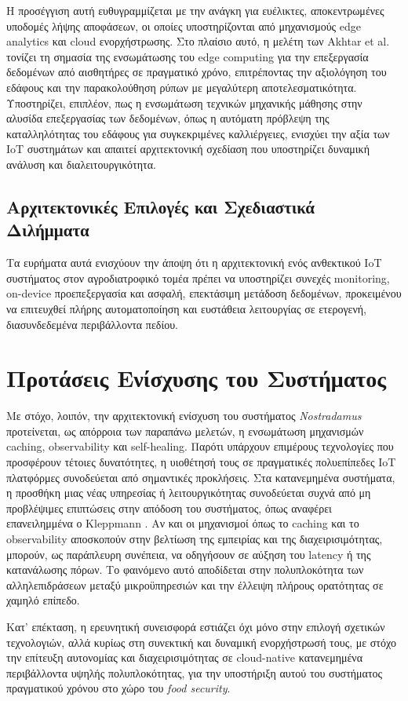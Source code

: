 Η προσέγγιση αυτή ευθυγραμμίζεται με την ανάγκη για ευέλικτες, αποκεντρωμένες υποδομές λήψης αποφάσεων, οι οποίες υποστηρίζονται από μηχανισμούς edge analytics και cloud ενορχήστρωσης. Στο πλαίσιο αυτό, η μελέτη των Akhtar et al. \cite{edgeagriculture} τονίζει τη σημασία της ενσωμάτωσης του edge computing για την επεξεργασία δεδομένων από αισθητήρες σε πραγματικό χρόνο, επιτρέποντας την αξιολόγηση του εδάφους και την παρακολούθηση ρύπων με μεγαλύτερη αποτελεσματικότητα. Υποστηρίζει, επιπλέον, πως η ενσωμάτωση τεχνικών μηχανικής μάθησης στην αλυσίδα επεξεργασίας των δεδομένων, όπως η αυτόματη πρόβλεψη της καταλληλότητας του εδάφους για συγκεκριμένες καλλιέργειες, ενισχύει την αξία των IoT συστημάτων και απαιτεί αρχιτεκτονική σχεδίαση που υποστηρίζει δυναμική ανάλυση και διαλειτουργικότητα.

\subsection{Αρχιτεκτονικές Επιλογές και Σχεδιαστικά Διλήμματα}

Τα ευρήματα αυτά ενισχύουν την άποψη ότι η αρχιτεκτονική ενός ανθεκτικού IoT συστήματος στον αγροδιατροφικό τομέα πρέπει να υποστηρίζει συνεχές monitoring, on-device προεπεξεργασία και ασφαλή, επεκτάσιμη μετάδοση δεδομένων, προκειμένου να επιτευχθεί πλήρης αυτοματοποίηση και ευστάθεια λειτουργίας σε ετερογενή, διασυνδεδεμένα περιβάλλοντα πεδίου.

\section{Προτάσεις Ενίσχυσης του Συστήματος}

Με στόχο, λοιπόν, την αρχιτεκτονική ενίσχυση του συστήματος \textit{Nostradamus} προτείνεται, ως απόρροια των παραπάνω μελετών, η ενσωμάτωση μηχανισμών caching, observability και self-healing. Παρότι υπάρχουν επιμέρους τεχνολογίες που προσφέρουν τέτοιες δυνατότητες, η υιοθέτησή τους σε πραγματικές πολυεπίπεδες IoT πλατφόρμες συνοδεύεται από σημαντικές προκλήσεις. Στα κατανεμημένα συστήματα, η προσθήκη μιας νέας υπηρεσίας ή λειτουργικότητας συνοδεύεται συχνά από μη προβλέψιμες επιπτώσεις στην απόδοση του συστήματος, όπως αναφέρει επανειλημμένα ο Kleppmann \cite{kleppmanndda}. Αν και οι μηχανισμοί όπως το caching και το observability αποσκοπούν στην βελτίωση της εμπειρίας και της διαχειρισιμότητας, μπορούν, ως παράπλευρη συνέπεια, να οδηγήσουν σε αύξηση του latency ή της κατανάλωσης πόρων. Το φαινόμενο αυτό αποδίδεται στην πολυπλοκότητα των αλληλεπιδράσεων μεταξύ μικροϋπηρεσιών και την έλλειψη πλήρους ορατότητας σε χαμηλό επίπεδο.

Κατ’ επέκταση, η ερευνητική συνεισφορά εστιάζει όχι μόνο στην επιλογή σχετικών τεχνολογιών, αλλά κυρίως στη συνεκτική και δυναμική ενορχήστρωσή τους, με στόχο την επίτευξη αυτονομίας και διαχειρισιμότητας σε cloud-native κατανεμημένα περιβάλλοντα υψηλής πολυπλοκότητας, για την υποστήριξη αυτού του συστήματος πραγματικού χρόνου στο χώρο του \textit{food security}.
